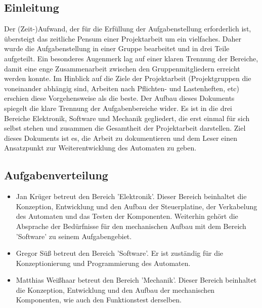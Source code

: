 \documentclass{scrartcl}
\begin{document}
\subsection{Einleitung}
Der (Zeit-)Aufwand, der für die Erfüllung der Aufgabenstellung erforderlich ist, übersteigt das zeitliche Pensum einer Projektarbeit um ein vielfaches. Daher wurde die Aufgabenstellung in einer Gruppe bearbeitet und in drei Teile aufgeteilt. Ein besonderes Augenmerk lag auf einer klaren Trennung der Bereiche, damit eine enge Zusammenarbeit zwischen den Gruppenmitgliedern erreicht werden konnte. Im Hinblick auf die Ziele der Projektarbeit
(Projektgruppen die voneinander abhängig sind, Arbeiten nach Pflichten- und Lastenheften, etc) erschien diese Vorgehensweise als die beste. Der Aufbau dieses Dokuments spiegelt die klare Trennung der Aufgabenbereiche wider. Es ist in die drei Bereiche Elektronik, Software und Mechanik gegliedert, die erst einmal für sich selbst stehen und zusammen die Gesamtheit der Projektarbeit darstellen. Ziel dieses Dokuments ist es, die Arbeit zu dokumentieren und dem Leser einen Ansatzpunkt zur Weiterentwicklung des Automaten zu geben. 

\subsection{Aufgabenverteilung}
\begin{itemize}
\item
Jan Krüger betreut den Bereich 'Elektronik'. Dieser Bereich beinhaltet die Konzeption, Entwicklung und den Aufbau der Steuerplatine, der Verkabelung des Automaten und das Testen der Komponenten. Weiterhin gehört die Absprache der Bedürfnisse für den mechanischen Aufbau mit dem Bereich 'Software' zu seinem Aufgabengebiet. 
\item
Gregor Süß betreut den Bereich 'Software'. Er ist zuständig für die Konzeptionierung und Programmierung des Automaten. 
\item
Matthias Weißhaar betreut den Bereich 'Mechanik'. Dieser Bereich beinhaltet die Konzeption, Entwicklung und den Aufbau der mechanischen Komponenten, wie auch den Funktionstest derselben. 
\end{itemize}



\newpage
\end{document}
